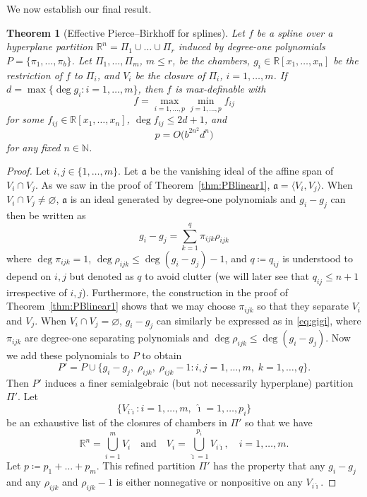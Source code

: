 \documentclass[11pt]{amsart}
\theoremstyle{plain}
\newtheorem{theorem}{Theorem}[section]
\theoremstyle{definition}
\newcommand{\ih}{\hat{\imath}}
\begin{document}
We now establish our final result.
\begin{theorem}[Effective Pierce--Birkhoff for splines]\label{thm:eff}
Let $f$ be a spline over a hyperplane partition $\mathbb{R}^n = \Pi_1 \cup \dots \cup \Pi_r$ induced by degree-one polynomials $P = \{\pi_1, \dots, \pi_b\}$. Let $\Pi_1,\dots,\Pi_m$,  $m \le r$, be the chambers, $g_i \in \mathbb{R}[x_1, \dots, x_n]$ be the restriction of $f$ to $\Pi_i$, and $V_i $ be the closure of $\Pi_i$, $i =1,\dots,m$. If  $d  = \max \{ \deg g_i : i = 1,\dots,m\}$, then $f$ is max-definable with
\[
f = \max_{i = 1,\dots,p} \min_{j = 1,\dots,p} f_{ij}
\]
for some $f_{ij} \in \mathbb{R}[x_1, \dots, x_n]$, $\deg f_{ij} \le 2d+1$, and
\[
p = O\bigl( b^{2n^2}d^n \bigr)
\]
for any fixed $n \in \mathbb{N}$.
\end{theorem}
\begin{proof}
Let $i,j \in \{1,\dots,m\}$. 
Let $\mathfrak{a}$ be the vanishing ideal of the affine span of $V_i \cap V_j$. As we saw in the proof of Theorem~\ref{thm:PBlinear1}, $\mathfrak{a} = \langle V_i, V_j\rangle$. When $V_i \cap V_j \neq \varnothing$, $\mathfrak{a}$ is an ideal generated by degree-one polynomials and $g_i-g_j$ can then be written as
\begin{equation}\label{eq:gigi}
g_i - g_j = \sum_{k=1}^q \pi_{ijk} \rho_{ijk}
\end{equation}
where $\deg \pi_{ijk} = 1$, $\deg \rho_{ijk} \le \deg (g_i - g_j) -1$, and $q \coloneqq q_{ij}$ is understood to depend on $i,j$ but denoted as $q$ to avoid clutter (we will later see that $q_{ij} \le n+1$ irrespective of $i,j$). Furthermore, the construction in the proof of Theorem~\ref{thm:PBlinear1} shows that we may choose $\pi_{ijk}$ so that they separate $V_i$ and $V_j$. When $V_i \cap V_j = \varnothing$, $g_i-g_j$ can similarly be expressed as in \eqref{eq:gigi}, where $\pi_{ijk}$ are degree-one separating polynomials and $\deg \rho_{ijk} \le \deg (g_i - g_j)$.  Now we add these polynomials to $P$ to obtain
\begin{equation}\label{eq:P'}
P' = P  \cup \{ g_i - g_j, \; \rho_{ijk}, \; \rho_{ijk}-1 : i,j = 1,\dots, m, \; k = 1,\dots,q \}.
\end{equation}
Then $P'$ induces a finer semialgebraic (but not necessarily hyperplane) partition $\Pi'$. Let
\[
\{V_{i \ih } : i = 1,\dots,m, \; \ih  = 1, \dots, p_i\}
\]
be an exhaustive list of the closures of chambers in $\Pi'$ so that we have
\[
\mathbb{R}^n = \bigcup_{i =1}^m V_i \quad\text{and}\quad
V_i = \bigcup_{\ih =1}^{p_i} V_{i \ih }, \quad i =1,\dots,m.
\]
Let $p \coloneqq  p_1 + \dots + p_m$. This refined partition $\Pi'$ has the property that any $g_i- g_j$ and any $\rho_{ijk}$ and $\rho_{ijk}-1$ is either nonnegative or nonpositive on any $V_{i \ih }$.


\end{proof}
\end{document}
